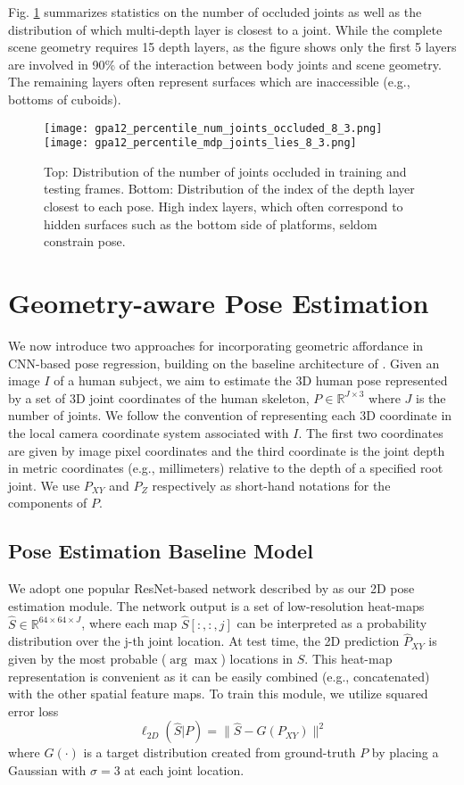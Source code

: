 \documentclass[times,referee,twocolumn,final,authoryear]{elsarticle}
\begin{document}
Fig. \ref{fig:occlusion} summarizes statistics on the number of occluded joints 
as well as the distribution of which multi-depth layer is closest to a joint. 
While the complete scene geometry requires 15 depth layers, as the figure shows
only the first 5 layers are involved in 90\% of the interaction between body 
joints and scene geometry. The remaining layers often represent surfaces which are 
inaccessible (e.g., bottoms of cuboids).

\begin{figure}
\centering
\texttt{[image: gpa12\_percentile\_num\_joints\_occluded\_8\_3.png]}
\texttt{[image: gpa12\_percentile\_mdp\_joints\_lies\_8\_3.png]}
\caption{ Top: Distribution of the number of joints occluded in training and
testing frames. Bottom: Distribution of the index of the depth layer closest 
to each pose. High index layers, which often correspond to hidden surfaces such
as the bottom side of platforms, seldom constrain pose.}
\label{fig:occlusion}
\end{figure}


\section{Geometry-aware Pose Estimation}

We now introduce two approaches for incorporating geometric affordance in
CNN-based pose regression, building on the baseline architecture of
\cite{Zhou_2017_ICCV}.  Given an image $I$ of a human subject, we aim to
estimate the 3D human pose represented by a set of 3D joint coordinates of the
human skeleton, $P \in \mathbb{R}^{J \times 3}$ where $J$ is the number of
joints.  We follow the convention of representing each 3D coordinate in
the local camera coordinate system associated with $I$. The first two
coordinates are given by image pixel coordinates and the third coordinate is
the joint depth in metric coordinates (e.g., millimeters) relative to the
depth of a specified root joint. We use $P_{XY}$ and $P_{Z}$ respectively as 
short-hand notations for the components of $P$.

\subsection{Pose Estimation Baseline Model}
We adopt one popular ResNet-based network described by \cite{xiao2018simple} 
as our 2D pose estimation module. The network output is a set of low-resolution
heat-maps $\hat{S} \in \mathbb{R}^{64 \times 64 \times J}$, where each map
${\hat S}[:,:,j]$ can be interpreted as a probability distribution over the j-th joint
location.  At test time, the 2D prediction ${\hat P}_{XY}$ is given by the most
probable ($\arg\max$) locations in $S$.  This heat-map representation is
convenient as it can be easily combined (e.g., concatenated) with the other
spatial feature maps. To train this module, we utilize squared error loss 
\begin{equation}
{\ell_{2D}({\hat S}|P)} = \| {\hat S} - G(P_{XY}) \|^2
  \label{eqn:l2d}
\end{equation}
where $G(\cdot)$ is a target distribution created from ground-truth $P$ by placing
a Gaussian with $\sigma=3$ at each joint location. 
\end{document}
